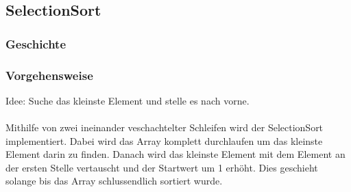 \documentclass{article}
\begin{document}
\subsection{SelectionSort}
\subsubsection{Geschichte}
\subsubsection{Vorgehensweise}
Idee: Suche das kleinste Element und stelle es nach vorne. \\ \\
Mithilfe von zwei ineinander veschachtelter Schleifen wird der SelectionSort implementiert. Dabei wird das Array komplett durchlaufen um das kleinste Element darin zu finden. Danach wird das kleinste Element mit dem Element an der ersten Stelle vertauscht und der Startwert um 1 erhöht. Dies geschieht solange bis das Array schlussendlich sortiert wurde.
\end{document}
